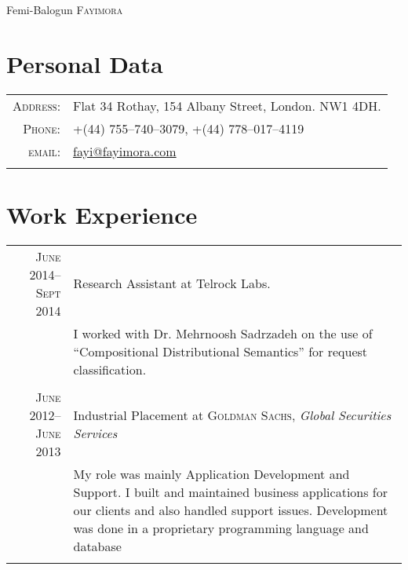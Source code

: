 \documentclass[a4paper,10pt]{article}
\begin{document}
\pagestyle{empty} %


\par{\centering
  {\Huge Femi-Balogun \textsc{Fayimora}
}\bigskip\par}

\section{Personal Data}

\begin{tabular}{rl}
  \textsc{Address:}   & Flat 34 Rothay, 154 Albany Street, London. NW1 4DH. \\
  \textsc{Phone:}     & +(44) 755--740--3079, +(44) 778--017--4119 \\
  \textsc{email:}     & \href{mailto:fayi@fayimora.com}{fayi@fayimora.com}\\\\
\end{tabular}

\section{Work Experience}
\begin{tabular}{r|p{12cm}}
  \textsc{June 2014--Sept 2014} & Research Assistant at Telrock Labs.\\&
  \footnotesize{I worked with Dr. Mehrnoosh Sadrzadeh on the use of ``Compositional Distributional Semantics'' for request classification.}\\\\

  \textsc{June 2012--June 2013} & Industrial Placement at \textsc{Goldman Sachs}, \emph{Global
  Securities Services}\\&
  \footnotesize{My role was mainly Application Development and Support. I built and maintained
    business applications for our clients and also handled support issues. Development was done
    in a proprietary programming language and database}\\\\

\end{tabular}
\end{document}
